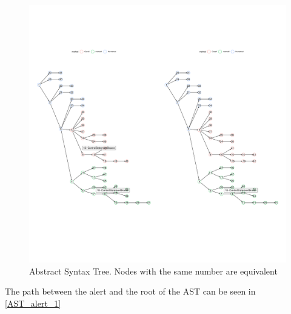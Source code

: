 \documentclass[
]{article}
\begin{document}



\begin{figure}[H]
\includegraphics[width=1\linewidth]{report_files/figure-latex/unnamed-chunk-4-1} \caption{Abstract Syntax Tree. Nodes with the same number are equivalent \label{AST_with_alerts}}\label{fig:unnamed-chunk-4}
\end{figure}

%
%



The path between the alert and the root of the AST can be seen in
\ref{AST_alert_1}

%
%
\end{document}

